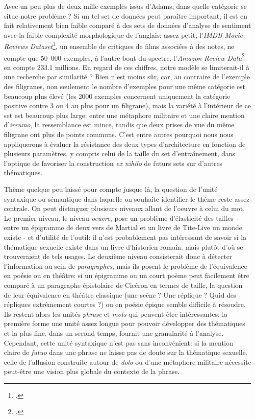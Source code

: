 Avec un peu plus de deux mille exemples issus d'Adams, dans quelle catégorie se situe notre problème ? Si un tel set de données peut paraître important, il est en fait relativement bien faible comparé à des sets de données d'analyse de sentiment avec la faible complexité morphologique de l'anglais: assez petit, l'\textit{IMDB Movie Reviews Dataset}\footcite{maas-EtAl:2011:ACL-HLT2011}, un ensemble de critiques de films associées à des notes, ne compte que 50~000 exemples, à l'autre bout du spectre, l'\textit{Amazon Review Data}\footcite{ni_justifying_2019} en compte 233.1 millions. En regard de ces chiffres, notre modèle se limiterait-il à une recherche par similarité ? Rien n'est moins sûr, car, au contraire de l'exemple des filigranes, non seulement le nombre d'exemples pour une même catégorie est beaucoup plus élevé (les 2000 exemples concernent uniquement la catégorie positive contre 3 ou 4 au plus pour un filigrane), mais la variété à l'intérieur de ce set est beaucoup plus large: entre une métaphore militaire et une claire mention d'\textit{irrumo}, la ressemblance est mince, tandis que deux prises de vue du même filigrane ont plus de points communs. C'est entre autres pourquoi nous nous appliquerons à évaluer la résistance des deux types d'architecture en fonction de plusieurs paramètres, y compris celui de la taille du set d'entraînement, dans l'optique de favoriser la construction \textit{ex nihilo} de futurs sets sur d'autres thématiques.


Thème quelque peu laissé pour compte jusque là, la question de l'unité syntaxique ou sémantique dans laquelle on souhaite identifier le thème reste assez centrale. On peut distinguer plusieurs niveaux allant de l'oeuvre à celui du mot. Le premier niveau, le niveau \textit{oeuvre}, pose un problème d'élasticité des tailles - entre un épigramme de deux vers de Martial et un livre de Tite-Live un monde existe - et d'utilité de l'outil: il n'est probablement pas intéressant de savoir si la thématique sexuelle existe dans un livre d'historien romain, mais plutôt d'où se trouveraient de tels usages. Le deuxième niveau consisterait donc à détecter l'information au sein de \textit{paragraphes}, mais ils posent le problème de l'équivalence en poésie ou en théâtre: si un épigramme ou un court poème peut facilement être comparé à un paragraphe épistolaire de Cicéron en termes de taille, la question de leur équivalence en théâtre classique (une scène ? Une réplique ? Quid des répliques extrêmement courtes ?) ou en poésie épique semble difficile à résoudre. Ils restent alors les unités \textit{phrase} et \textit{mots} qui peuvent être intéressantes: la première forme une unité assez longue pour pouvoir développer des thématiques et la plus fine, dans un second temps, fournit une granularité à l'analyse. Cependant, cette unité syntaxique n'est pas sans inconvénient: si la mention claire de \textit{futuo} dans une phrase ne laisse pas de doute sur la thématique sexuelle, celle de l'allusion construite autour de \textit{dolo} ou d'une métaphore militaire nécessite peut-être une vision plus globale du contexte de la phrase. 

